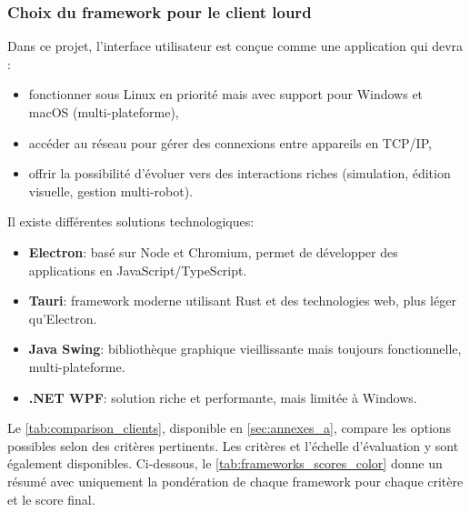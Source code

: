\subsubsection{Choix du framework pour le client lourd} \label{sec:client_code}

Dans ce projet, l’interface utilisateur est conçue comme une application qui devra :
\begin{itemize}
    \item fonctionner sous Linux en priorité mais avec support pour Windows et macOS (multi-plateforme),
    \item accéder au réseau pour gérer des connexions entre appareils en TCP/IP,
    \item offrir la possibilité d'évoluer vers des interactions riches (simulation, édition visuelle, gestion multi-robot).
\end{itemize}

Il existe différentes solutions technologiques:
\begin{itemize}
    \item \textbf{Electron}: basé sur Node et Chromium, permet de développer des applications en JavaScript/TypeScript.
    \item \textbf{Tauri}: framework moderne utilisant Rust et des technologies web, plus léger qu’Electron.
    \item \textbf{Java Swing}: bibliothèque graphique vieillissante mais toujours fonctionnelle, multi-plateforme.
    \item \textbf{.NET WPF}: solution riche et performante, mais limitée à Windows.
\end{itemize}

Le \autoref{tab:comparison_clients}, disponible en \autoref{sec:annexes_a}, compare les options possibles selon des critères pertinents.
Les critères et l'échelle d'évaluation y sont également disponibles.
Ci-dessous, le \autoref{tab:frameworks_scores_color} donne un résumé avec uniquement la pondération de chaque framework pour chaque critère et le score final.

